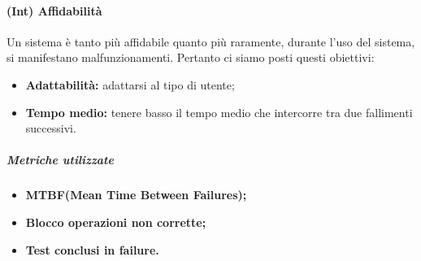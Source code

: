 \paragraph{\textbf{(Int) Affidabilità}}
	Un sistema è tanto più affidabile quanto più raramente, durante l'uso del sistema, si manifestano malfunzionamenti. Pertanto ci siamo posti questi obiettivi:
	\begin{itemize}
	\item \textbf{Adattabilità:} adattarsi al tipo di utente;
	\item \textbf{Tempo medio:} tenere basso il tempo medio che intercorre tra due fallimenti successivi.
\end{itemize}
\vspace{0.8cm}
\subparagraph{Metriche utilizzate}
\begin{itemize}
	\item \textbf{MTBF(Mean Time Between Failures);}
	\item \textbf{Blocco operazioni non corrette;}
	\item \textbf{Test conclusi in failure.}
\end{itemize}
\begin{table}[!htpb]
	\centering
	\renewcommand{\arraystretch}{2} 
	\caption{Metriche utilizzate per Affidabilità}
\end{table}
